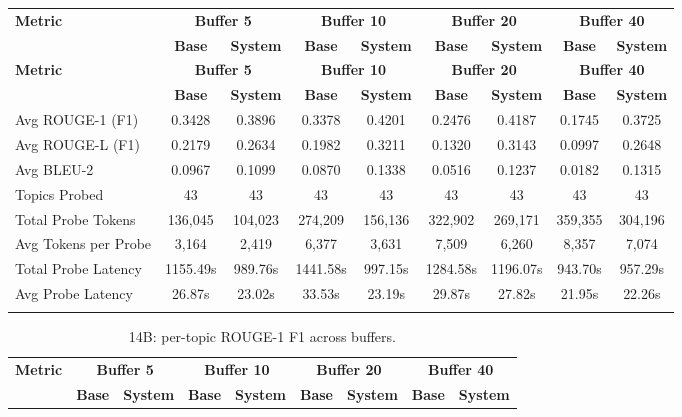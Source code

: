 \begin{landscape}
\begin{longtable}{@{}p{3.8cm}cccccccc@{}}
\toprule
\textbf{Metric} & \multicolumn{2}{c}{\textbf{Buffer 5}} & \multicolumn{2}{c}{\textbf{Buffer 10}} & \multicolumn{2}{c}{\textbf{Buffer 20}} & \multicolumn{2}{c}{\textbf{Buffer 40}} \\
\cmidrule(lr){2-3}\cmidrule(lr){4-5}\cmidrule(lr){6-7}\cmidrule(lr){8-9}
 & \textbf{Base} & \textbf{System} & \textbf{Base} & \textbf{System} & \textbf{Base} & \textbf{System} & \textbf{Base} & \textbf{System} \\
\midrule
\endfirsthead

\toprule
\textbf{Metric} & \multicolumn{2}{c}{\textbf{Buffer 5}} & \multicolumn{2}{c}{\textbf{Buffer 10}} & \multicolumn{2}{c}{\textbf{Buffer 20}} & \multicolumn{2}{c}{\textbf{Buffer 40}} \\
\cmidrule(lr){2-3}\cmidrule(lr){4-5}\cmidrule(lr){6-7}\cmidrule(lr){8-9}
 & \textbf{Base} & \textbf{System} & \textbf{Base} & \textbf{System} & \textbf{Base} & \textbf{System} & \textbf{Base} & \textbf{System} \\
\midrule
\endhead
Avg ROUGE-1 (F1) & 0.3428 & 0.3896 & 0.3378 & 0.4201 & 0.2476 & 0.4187 & 0.1745 & 0.3725 \\
Avg ROUGE-L (F1) & 0.2179 & 0.2634 & 0.1982 & 0.3211 & 0.1320 & 0.3143 & 0.0997 & 0.2648 \\
Avg BLEU-2 & 0.0967 & 0.1099 & 0.0870 & 0.1338 & 0.0516 & 0.1237 & 0.0182 & 0.1315 \\
Topics Probed & 43 & 43 & 43 & 43 & 43 & 43 & 43 & 43 \\
Total Probe Tokens & 136,045 & 104,023 & 274,209 & 156,136 & 322,902 & 269,171 & 359,355 & 304,196 \\
Avg Tokens per Probe & 3,164 & 2,419 & 6,377 & 3,631 & 7,509 & 6,260 & 8,357 & 7,074 \\
Total Probe Latency & 1155.49s & 989.76s & 1441.58s & 997.15s & 1284.58s & 1196.07s & 943.70s & 957.29s \\
Avg Probe Latency & 26.87s & 23.02s & 33.53s & 23.19s & 29.87s & 27.82s & 21.95s & 22.26s \\
\botrule
\end{longtable}
\begin{longtable}{@{}p{3.8cm}cccccccc@{}}
\caption{14B: per-topic ROUGE-1 F1 across buffers.}\label{tab:app_14b_rouge1_topics}\\

\toprule
\textbf{Metric} & \multicolumn{2}{c}{\textbf{Buffer 5}} & \multicolumn{2}{c}{\textbf{Buffer 10}} & \multicolumn{2}{c}{\textbf{Buffer 20}} & \multicolumn{2}{c}{\textbf{Buffer 40}} \\
\cmidrule(lr){2-3}\cmidrule(lr){4-5}\cmidrule(lr){6-7}\cmidrule(lr){8-9}
 & \textbf{Base} & \textbf{System} & \textbf{Base} & \textbf{System} & \textbf{Base} & \textbf{System} & \textbf{Base} & \textbf{System} \\
\midrule
\endfirsthead


\end{longtable}
\end{landscape}
